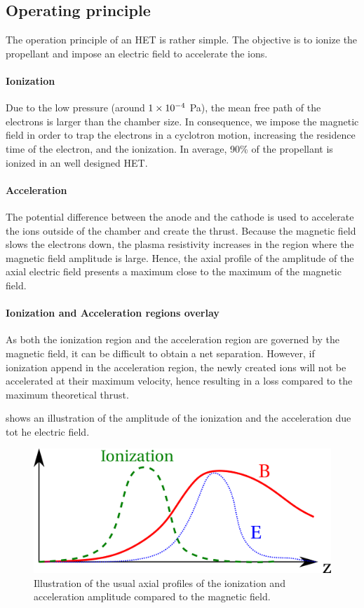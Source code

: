 \subsection{Operating principle}

The operation principle of an \ac{HET} is rather simple.
The objective is to ionize the propellant and impose an electric field to accelerate the ions.

\paragraph{Ionization}
Due to the low pressure (around ${1}\times 10^{-4}$ Pa), the mean free path of the electrons is larger than the chamber size.
In consequence, we impose the magnetic field in order to trap the electrons in a cyclotron motion, increasing the residence time of the electron, and the ionization.
In average, 90\% of the propellant is ionized in an well designed \ac{HET}.

\paragraph{Acceleration}
The potential difference  between the anode and the cathode is used to accelerate the ions outside of the chamber and create the thrust.
Because the magnetic field slows the electrons down, the plasma resistivity increases in the region where the magnetic field amplitude is large.
Hence, the axial profile of the amplitude of the axial electric field presents a maximum close to the maximum of the magnetic field.

\paragraph{Ionization and Acceleration regions overlay}
As both the ionization region and the acceleration region are governed by the magnetic field, it can be difficult to obtain a net separation.
However, if ionization append in the acceleration region, the newly created ions will not be accelerated at their maximum velocity, hence resulting in a loss compared to the maximum theoretical thrust.

 shows an illustration of the amplitude of the ionization and the acceleration due tot he electric field.
\begin{figure}[hbtp]
  \centering
  \includegraphics[width=\defaultwidth]{zones}
  \caption{Illustration of the usual axial profiles of the ionization and acceleration amplitude compared to the magnetic field.}
  \label{fig-zones}
\end{figure}

